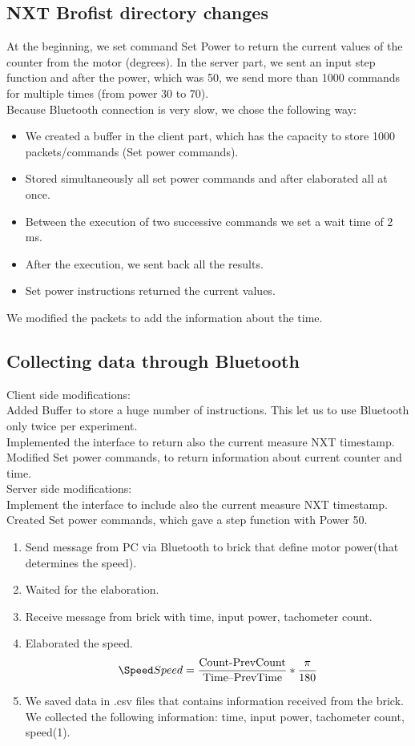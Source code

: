 \documentclass[a4paper,12pt,oneside]{article}
\begin{document}
\subsection{NXT Brofist directory changes}
At the beginning, we set command Set Power to return the current values of the counter from the motor (degrees). 
In the server part, we sent an input step function and after the power, which was 50, we send more than 1000 commands for multiple times (from power 30 to 70).
\\
Because Bluetooth connection is very slow, we chose the following way:
\begin{itemize}
\item We created a buffer in the client part, which has the capacity to store 1000 packets/commands (Set power commands).
\item Stored simultaneously all set power commands and after elaborated all at once.
\item Between the execution of two successive commands we set a wait time of 2 ms.
\item After the execution, we sent back all the results.
\item Set power instructions returned the current values.
\end{itemize}
We modified the packets to add the information about the time.


\subsection{Collecting data through Bluetooth }
Client side modifications:
\\
Added Buffer to store a huge number of instructions. This let us to use Bluetooth only twice per experiment.
\\
Implemented the interface to return also the current measure NXT timestamp.
\\
Modified Set power commands, to return information about current counter and time.
\\
 Server side modifications:
\\
 Implement the interface to include also the current measure NXT timestamp. 
\\
Created Set power commands, which gave a step function with Power 50. 
\begin{enumerate}
\item Send message from PC via Bluetooth to brick that define motor power(that determines the speed).
\item Waited for the elaboration.
\item Receive message from brick with time, input power, tachometer count.
\item Elaborated the speed. 	
\begin{equation}
\Speed Speed = \frac{\text{Count-PrevCount}}{\text{Time–PrevTime}}*\frac{\pi}{180}
\end{equation}
\item We saved data in .csv files that contains information received from the brick. We collected the following information: time, input power, tachometer count, speed(1).
\end{enumerate}
\end{document}
